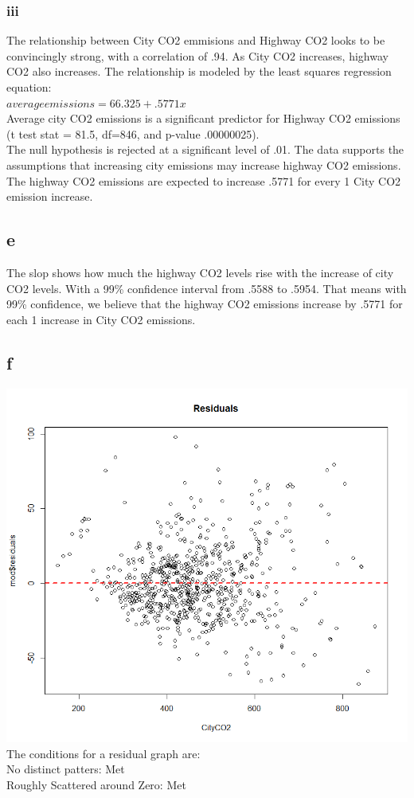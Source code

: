 \documentclass[10pt,letterpaper]{article}
\begin{document}
\subsubsection*{iii}
The relationship between City CO2 emmisions and Highway CO2 looks to be convincingly
strong, with a correlation of .94. As City CO2 increases, highway CO2 also increases.
The relationship is modeled by the least squares regression equation:\\
$average emissions = 66.325 + .5771x$\\
Average city CO2 emissions is a significant predictor for Highway CO2 emissions
(t test stat = 81.5, df=846, and p-value .00000025).\\
The null hypothesis is rejected at a significant level of .01. The data supports
the assumptions that increasing city emissions may increase highway CO2 emissions.
The highway CO2 emissions are expected to increase .5771 for every 1 City CO2 emission
increase. 

\subsection*{e}
The slop shows how much the highway CO2 levels rise with the increase of city
CO2 levels. With a 99\% confidence interval from .5588 to .5954. That means
with 99\% confidence, we believe that the highway CO2 emissions increase
by .5771 for each 1 increase in City CO2 emissions. 

\subsection*{f}
\includegraphics[scale=.6]{residuals}\\
The conditions for a residual graph are:\\
No distinct patters: Met\\
Roughly Scattered around Zero: Met\\
\end{document}
